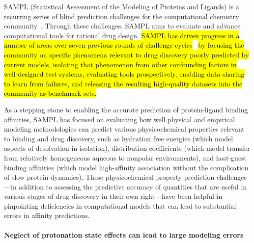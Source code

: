 \documentclass[9pt,lineno]{elife}
\begin{document}
SAMPL (Statistical Assessment of the Modeling of Proteins and Ligands) is a recurring series of blind prediction challenges for the computational chemistry community~\citep{mobley_advancing_2016, sample_D3R_website}. 
Through these challenges, SAMPL aims to evaluate and advance computational tools for rational drug design. 
\hl{SAMPL has driven progress in a number of areas over seven previous rounds of challenge cycles}~\cite{nicholls_predicting_2008,guthrie_blind_2009,skillman_sampl2_2010,geballe_sampl2_2010,skillman_sampl3_2012,skillman_sampl3_2012,geballe_sampl3_2012,muddana_sampl3_2012,guthrie_sampl4_2014,Mobley:2014:JComputAidedMolDesa,muddana_sampl4_2014,mobley_blind_2014,yin_overview_2016,Bannan:2016:JComputAidedMolDes} \hl{by focusing the community on specific phenomena relevant to drug discovery poorly predicted by current models, isolating that phenomenon from other confounding factors in well-designed test systems, evaluating tools prospectively, enabling data sharing to learn from failures, and releasing the resulting high-quality datasets into the community as benchmark sets.}

As a stepping stone to enabling the accurate prediction of protein-ligand binding affinities, SAMPL has focused on evaluating how well physical and empirical modeling methodologies can predict various physicochemical properties relevant to binding and drug discovery, such as hydration free energies (which model aspects of desolvation in isolation), distribution coefficients (which model transfer from relatively homogeneous aqueous to nonpolar environments), and host-guest binding affinities (which model high-affinity association without the complication of slow protein dynamics).
These physicochemical property prediction challenges---in addition to assessing the predictive accuracy of quantities that are useful in various stages of drug discovery in their own right---have been helpful in pinpointing deficiencies in computational models that can lead to substantial errors in affinity predictions. 

\paragraph{Neglect of protonation state effects can lead to large modeling errors}
\end{document}
